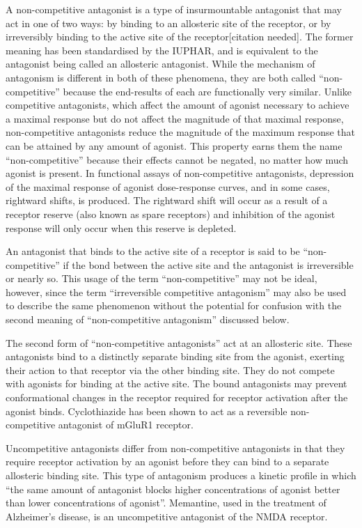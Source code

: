 A non-competitive antagonist is a type of insurmountable antagonist that may act in one of two ways: by binding to an allosteric site of the receptor, or by irreversibly binding to the active site of the receptor{[}citation needed{]}. The former meaning has been standardised by the IUPHAR, and is equivalent to the antagonist being called an allosteric antagonist. While the mechanism of antagonism is different in both of these phenomena, they are both called ``non-competitive'' because the end-results of each are functionally very similar. Unlike competitive antagonists, which affect the amount of agonist necessary to achieve a maximal response but do not affect the magnitude of that maximal response, non-competitive antagonists reduce the magnitude of the maximum response that can be attained by any amount of agonist. This property earns them the name ``non-competitive'' because their effects cannot be negated, no matter how much agonist is present. In functional assays of non-competitive antagonists, depression of the maximal response of agonist dose-response curves, and in some cases, rightward shifts, is produced. The rightward shift will occur as a result of a receptor reserve (also known as spare receptors) and inhibition of the agonist response will only occur when this reserve is depleted.

An antagonist that binds to the active site of a receptor is said to be ``non-competitive'' if the bond between the active site and the antagonist is irreversible or nearly so. This usage of the term ``non-competitive'' may not be ideal, however, since the term ``irreversible competitive antagonism'' may also be used to describe the same phenomenon without the potential for confusion with the second meaning of ``non-competitive antagonism'' discussed below.

The second form of ``non-competitive antagonists'' act at an allosteric site. These antagonists bind to a distinctly separate binding site from the agonist, exerting their action to that receptor via the other binding site. They do not compete with agonists for binding at the active site. The bound antagonists may prevent conformational changes in the receptor required for receptor activation after the agonist binds. Cyclothiazide has been shown to act as a reversible non-competitive antagonist of mGluR1 receptor.

Uncompetitive antagonists differ from non-competitive antagonists in that they require receptor activation by an agonist before they can bind to a separate allosteric binding site. This type of antagonism produces a kinetic profile in which ``the same amount of antagonist blocks higher concentrations of agonist better than lower concentrations of agonist''. Memantine, used in the treatment of Alzheimer's disease, is an uncompetitive antagonist of the NMDA receptor.

